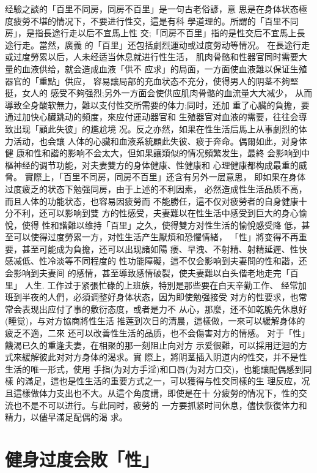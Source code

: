 \documentclass[12pt,UTF8]{ctexbook}
\begin{document}
经驗之談的「百里不同房，同房不百里」是一句古老俗諺，意
思是在身体状态極度疲勞不堪的情况下，不要进行性交，這是有科
學道理的。所謂的「百里不同房」，是指長途行走以后不宜馬上性
交;「同房不百里」指的是性交后不宜馬上長途行走。當然，廣義
的「百里」还包括劇烈運动或过度勞动等情况。
在長途行走或过度勞累以后，人未经适当休息就进行性生活，
肌肉骨骼和性器官同时需要大量的血液供给，就会造成血液「供不
应求」的局面，一方面使血液難以保证生殖器官的「重點」供应，
容易讓局部的充血状态不充分，使得男人的阴茎不夠堅挺，女人的
感受不夠强烈;另外一方面会使供应肌肉骨骼的血流量大大减少，
从而導致全身酸软無力，難以支付性交所需要的体力;同时，还加
重了心臟的負擔，要通过加快心臟跳动的頻度，來应付運动器官和
生殖器官对血液的需要，往往会導致出现「顧此失彼」的尷尬境
况。反之亦然，如果在性生活后馬上从事劇烈的体力活动，也会讓
人体的心臟和血液系統顧此失彼、疲于奔命。偶爾如此，对身体健
康和性和諧的影响不会太大，但如果讓類似的情况頻繁发生，最終
会影响到中樞神经的调节功能，对夫妻雙方的身体健康、性健康和
心理健康都构成最重的威脅。
實際上，「百里不同房，同房不百里」还含有另外一层意思，
即如果在身体过度疲乏的状态下勉强同房，由于上述的不利因素，
必然造成性生活品质不高，而且人体的功能状态，也容易因疲勞而
不能勝任，這不仅对疲勞者的自身健康十分不利，还可以影响到雙
方的性感受，夫妻難以在性生活中感受到巨大的身心愉悅，使得
性和諧難以维持「百里」之久，使得雙方对性生活的愉悅感受降
低，甚至可以使得过度勞累一方，对性生活产生厭煩和恐懼情緒，
「性」將变得不再重要，甚至可能成为負擔，还可以出现諸如陽
痿、早洩、不射精、射精延遲、性快感减低、性冷淡等不同程度的
性功能障礙，這不仅会影响到夫妻問的性和諧，还会影响到夫妻间
的感情，甚至導致感情破裂，使夫妻難以白头偕老地走完「百里」
人生.
工作过于紧張忙碌的上班族，特別是那些要在白天辛勤工作、
经常加班到半夜的人們，必須调整好身体状态，因为即使勉强接受
对方的性要求，也常常会表现出应付了事的敷衍态度，或者是力不
从心，那麼，还不如乾脆先休息好(睡觉)，与对方協商將性生活
推莲到次日的清晨，這樣做，一來可以緩解身体的疲乏不適，二來
还可以改善性生活的品质，也不会傷害对方的情感。
对于「性」饑渴已久的重逢夫妻，在相聚的那一刻阻止向对方
示爱很難，可以採用迂迴的方式來緩解彼此对对方身体的渴求。實
際上，將阴茎插入阴道内的性交，并不是性生活的唯一形式，使用
手指(为对方手淫)和口唇(为对方口交)，也能讓配偶感到同樣
的滿足，這也是性生活的重要方式之一，可以獲得与性交同樣的生
理反应，况且這樣做体力支出也不大。从這个角度講，即使是在十
分疲勞的情况下，性的交流也不是不可以进行。与此同时，疲勞的
一方要抓紧时间休息，儘快恢復体力和精力，以儘早滿足配偶的渴
求。

\section{健身过度会敗「性」}
\end{document}
